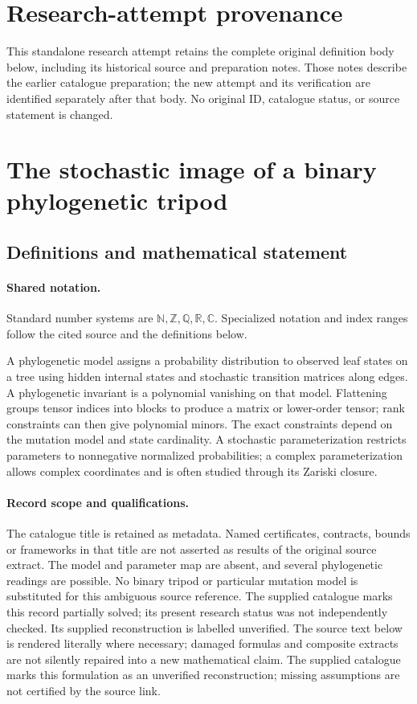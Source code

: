 \documentclass[11pt]{article}
\begin{document}
\section*{Research-attempt provenance}
This standalone research attempt retains the complete original definition body below,
including its historical source and preparation notes. Those notes describe the
earlier catalogue preparation; the new attempt and its verification are identified
separately after that body. No original ID, catalogue status, or source statement is changed.

\section{The stochastic image of a binary phylogenetic tripod}\label{statement}

\subsection{Definitions and mathematical statement}

\paragraph{Shared notation.}Standard number systems are $\mathbb N,\mathbb Z,\mathbb Q,\mathbb R,\mathbb C$. Specialized notation and index ranges follow the cited source and the definitions below.


A phylogenetic model assigns a probability distribution to observed leaf states on a tree using hidden internal states and stochastic transition matrices along edges. A phylogenetic invariant is a polynomial vanishing on that model. Flattening groups tensor indices into blocks to produce a matrix or lower-order tensor; rank constraints can then give polynomial minors. The exact constraints depend on the mutation model and state cardinality. A stochastic parameterization restricts parameters to nonnegative normalized probabilities; a complex parameterization allows complex coordinates and is often studied through its Zariski closure.
\paragraph{Record scope and qualifications.}
The catalogue title is retained as metadata. Named certificates, contracts, bounds or frameworks in that title are not asserted as results of the original source extract.
The model and parameter map are absent, and several phylogenetic readings are possible. No binary tripod or particular mutation model is substituted for this ambiguous source reference. The supplied catalogue marks this record partially solved; its present research status was not independently checked. Its supplied reconstruction is labelled unverified.
The source text below is rendered literally where necessary; damaged formulas and composite extracts are not silently repaired into a new mathematical claim.
The supplied catalogue marks this formulation as an unverified reconstruction; missing assumptions are not certified by the source link.
\end{document}

